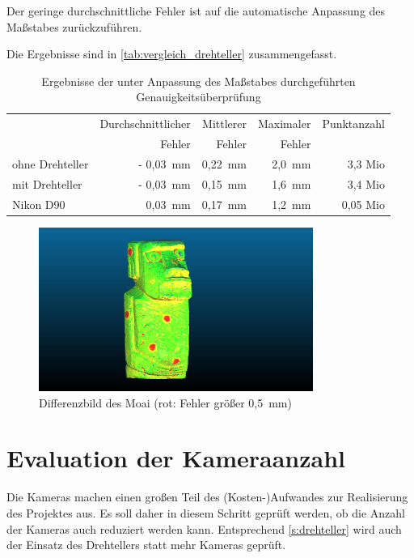 \documentclass[./00PhotoBox.tex]{subfiles}
\begin{document}
Der geringe durchschnittliche Fehler ist auf die automatische Anpassung des Maßstabes zurückzuführen.

Die Ergebnisse sind in \autoref{tab:vergleich_drehteller} zusammengefasst.

\begin{table}
    \centering
    \caption{Ergebnisse der unter Anpassung des Maßstabes durchgeführten Genauigkeitsüberprüfung}
    \label{tab:vergleich_drehteller}
    \begin{tabular}{l|r|r|r|r}
        \toprule
                        & Durchschnittlicher & Mittlerer & Maximaler & Punktanzahl \\
                        & Fehler             & Fehler    & Fehler    &             \\
        \midrule
        ohne Drehteller & - 0,03~mm          & 0,22~mm   & 2,0~mm    & 3,3 Mio     \\
        mit Drehteller  & - 0,03~mm          & 0,15~mm   & 1,6~mm    & 3,4 Mio     \\
        Nikon D90       & 0,03~mm            & 0,17~mm   & 1,2~mm    & 0,05 Mio    \\
        \bottomrule
    \end{tabular}
\end{table}

\begin{figure}
    \centering
    \includegraphics[width=0.8\textwidth]{img/moai_fehler_drehteller.jpg}
    \caption{Differenzbild des Moai (rot: Fehler größer 0,5~mm)}
    \label{img:drehteller_moai_fehler}
\end{figure}



\section{Evaluation der Kameraanzahl}
\label{s:kameraanzahl}
Die Kameras machen einen großen Teil des (Kosten-)Aufwandes zur Realisierung des Projektes aus. Es soll daher in diesem Schritt geprüft werden, ob die Anzahl der Kameras auch reduziert werden kann. Entsprechend \autoref{s:drehteller} wird auch der Einsatz des Drehtellers statt mehr Kameras geprüft.
\end{document}
